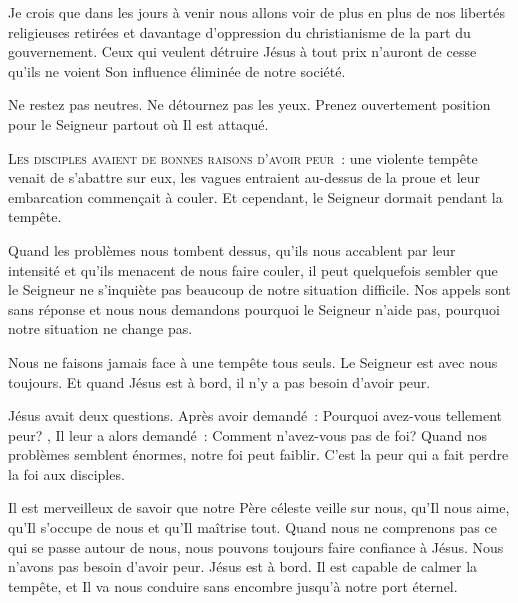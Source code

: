 Je crois que dans les jours à venir nous allons voir de plus en plus
 de nos libertés religieuses retirées et davantage d'oppression
 du christianisme 
 de la part du gouvernement.
 Ceux qui veulent détruire Jésus à tout prix n'auront de cesse
 qu'ils ne voient Son influence éliminée de notre société.

Ne restez pas neutres. Ne détournez pas les yeux.
 Prenez ouvertement position pour le Seigneur partout où Il est attaqué.

\dvrule






\lettrine{L}{es disciples avaient de bonnes raisons d'avoir peur}~:
 une violente tempête venait de s'abattre sur eux,
 les vagues entraient au-dessus de la proue et leur embarcation
 commençait à couler. Et cependant, le Seigneur dormait pendant la tempête.

Quand les problèmes nous tombent dessus, qu'ils nous accablent
 par leur intensité et qu'ils menacent de nous faire couler,
 il peut quelquefois sembler que le Seigneur ne s'inquiète pas beaucoup
 de notre situation difficile. Nos appels sont sans réponse
 et nous nous demandons pourquoi le Seigneur n'aide pas,
 pourquoi notre situation ne change pas.

Nous ne faisons jamais face à une tempête tous seuls.
 Le Seigneur est avec nous \ocadr toujours.
 Et quand Jésus est à bord, il n'y a pas besoin d'avoir peur.

Jésus avait deux questions. Après avoir demandé~: 
 \og Pourquoi avez-vous tellement peur? \fg{}, Il leur a alors demandé~: 
 \og Comment n'avez-vous pas de foi? \fg{}
 Quand nos problèmes semblent énormes, notre foi peut faiblir.
 C'est la peur qui a fait perdre la foi aux disciples.


Il est merveilleux de savoir que notre Père céleste veille sur nous,
 qu'Il nous aime, qu'Il s'occupe de nous et qu'Il maîtrise tout.
 Quand nous ne comprenons pas ce qui se passe autour de nous,
 nous pouvons toujours faire confiance à Jésus.
 Nous n'avons pas besoin d'avoir peur. Jésus est à bord.
 Il  est capable de calmer la tempête,
 et Il va nous conduire sans encombre jusqu'à notre port éternel.

